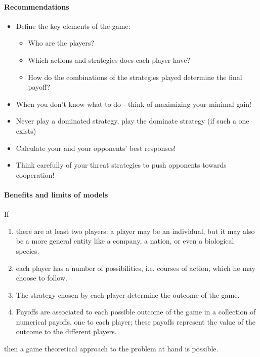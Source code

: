 \paragraph{Recommendations}

\begin{itemize}
    \item Define the key elements of the game:
        \begin{itemize}
            \item Who are the players?
            \item Which actions and strategies does each player have?
            \item How do the combinations of the strategies played determine the final payoff?
        \end{itemize}
    \item When you don't know what to do - think of maximizing your minimal gain!
    \item Never play a dominated strategy, play the dominate strategy (if such a one exists)
    \item Calculate your and your opponents' best responses!
    \item Think carefully of your threat strategies to push opponents towards cooperation!
\end{itemize}

\paragraph{Benefits and limits of models}

If
\begin{enumerate}[i]
    \item there are at least two players: a player may be an individual,
        but it may also be a more general entity like a company, a nation,
        or even a biological species.
    \item each player has a number of possibilities, i.e. courses
        of action, which he may choose to follow.
    \item The strategy chosen by each player determine the outcome
        of the game.
    \item Payoffs are associated to each possible outcome of the
        game in a collection of numerical payoffs, one to each
        player; these payoffs represent the value of the outcome
        to the different players.
\end{enumerate}
then a game theoretical approach to the problem at hand is possible.


